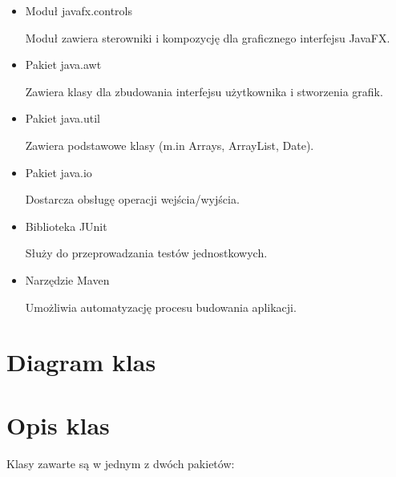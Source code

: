 \documentclass[]{article}
\begin{document}
\begin{itemize}
    \item Moduł javafx.controls
    
    Moduł zawiera sterowniki i kompozycję dla graficznego interfejsu JavaFX. 
    \item Pakiet java.awt
   
    Zawiera klasy dla zbudowania interfejsu użytkownika i stworzenia grafik.
    \item Pakiet java.util
   
    Zawiera podstawowe klasy (m.in Arrays, ArrayList, Date).
    \item Pakiet java.io
   
    Dostarcza obsługę operacji wejścia/wyjścia.
    \item Biblioteka JUnit 
    
    Służy do przeprowadzania testów jednostkowych.
    \item Narzędzie Maven 
    
    Umożliwia automatyzację procesu budowania aplikacji.
    
    
\end{itemize}

\section{Diagram klas}\label{header-n283}

\section{Opis klas}\label{header-n233}
Klasy zawarte są w jednym z dwóch pakietów:
\end{document}
